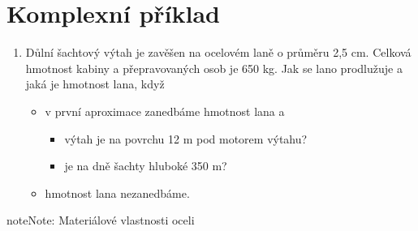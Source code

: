 \documentclass[letterpaper,10pt,english]{jupyterBook}
\begin{document}
{{\begin{enumerate}
\end{enumerate}

\noindent{}

\sphinxAtStartPar
{}


\section{Komplexní příklad}
\label{\detokenize{Cviceni/C2:komplexni-priklad}}\begin{enumerate}
%
\item {} 
\sphinxAtStartPar
Důlní šachtový výtah je zavěšen na ocelovém laně o průměru 2,5 cm. Celková hmotnost kabiny a přepravovaných osob je 650 kg. Jak se lano prodlužuje a jaká je hmotnost lana, když
\begin{itemize}
\item {} 
\sphinxAtStartPar
v první aproximace zanedbáme hmotnost lana  a
\begin{itemize}
\item {} 
\sphinxAtStartPar
výtah je na povrchu 12 m pod motorem výtahu?

\item {} 
\sphinxAtStartPar
je na dně šachty hluboké 350 m?

\end{itemize}

\item {} 
\sphinxAtStartPar
hmotnost lana nezanedbáme.

\end{itemize}

\end{enumerate}

\noindent{}

\begin{sphinxadmonition}{note}{Note:}
\sphinxAtStartPar
Materiálové vlastnosti oceli



\end{sphinxadmonition}}}
\end{document}
